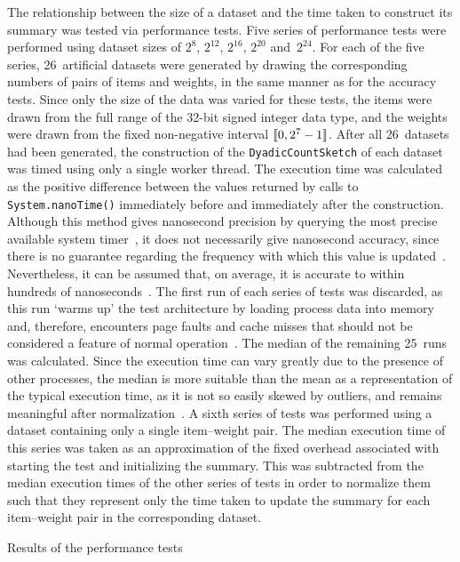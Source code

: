 The relationship between the size of a dataset and the time taken to construct its summary was tested via performance tests.
Five series of performance tests were performed using dataset sizes of \( 2^{8} \), \( 2^{12} \), \( 2^{16} \), \( 2^{20} \) and~\( 2^{24} \).
For each of the five series, \num{26}~artificial datasets were generated by drawing the corresponding numbers of pairs of items and weights, in the same manner as for the accuracy tests.
Since only the size of the data was varied for these tests, the items were drawn from the full range of the \num{32}-bit signed integer data type, and the weights were drawn from the fixed non-negative interval \( \llbracket0, 2^{7} - 1\rrbracket \).
After all \num{26}~datasets had been generated, the construction of the \lstinline{DyadicCountSketch} of each dataset was timed using only a single worker thread.
The execution time was calculated as the positive difference between the values returned by calls to \lstinline{System.nanoTime()} immediately before and immediately after the construction.
Although this method gives nanosecond precision by querying the most precise available system timer~\citep{o14}, it does not necessarily give nanosecond accuracy, since there is no guarantee regarding the frequency with which this value is updated~\citep{lambert08}.
Nevertheless, it can be assumed that, on average, it is accurate to within hundreds of nanoseconds~\citep{kuperberg09}.
The first run of each series of tests was discarded, as this run `warms up' the test architecture by loading process data into memory and, therefore, encounters page faults and cache misses that should not be considered a feature of normal operation~\citep{luo04}.
The median of the remaining \num{25}~runs was calculated.
Since the execution time can vary greatly due to the presence of other processes, the median is more suitable than the mean as a representation of the typical execution time, as it is not so easily skewed by outliers, and remains meaningful after normalization~\citep{fleming86}.
A sixth series of tests was performed using a dataset containing only a single item--weight pair.
The median execution time of this series was taken as an approximation of the fixed overhead associated with starting the test and initializing the summary.
This was subtracted from the median execution times of the other series of tests in order to normalize them such that they represent only the time taken to update the summary for each item--weight pair in the corresponding dataset.

\begin{table}
  \centering
  \caption{Results of the performance tests}
  \label{tab:dyadic-count-sketch-implementation-performance}
\end{table}

